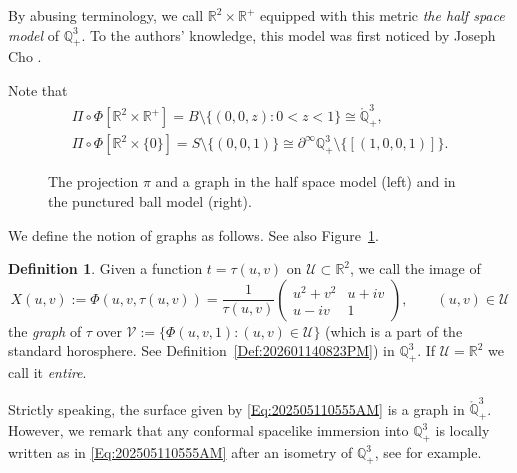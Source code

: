 \documentclass[12pt,reqno]{amsart}
\theoremstyle{plain} %
\theoremstyle{definition}
\newtheorem{definition}[theorem]{Definition}
\numberwithin{equation}{section}
\newcommand{\qthreep}{\mathbb{Q}^3_+}
\newcommand{\qthreept}{\mathring{\mathbb{Q}}^3_+}
\begin{document}
By abusing terminology, we call $\mathbb{R}^2 \times \mathbb{R}^+$ equipped with this metric \textit{the half space model} of $\qthreep$. To the authors' knowledge, this model was first noticed by Joseph Cho \cite{Cho}.

Note that
\begin{gather*}
	\Pi \circ \Phi[\mathbb{R}^2\times\mathbb{R}^+] = B\setminus\{(0,0,z):  0 < z < 1 \} \cong \qthreept, \\
	\Pi \circ \Phi[\mathbb{R}^2\times\{0\}] =S\setminus\{(0,0,1)\} \cong \partial^\infty\qthreep\setminus\{[(1,0,0,1)]\}.
\end{gather*}

\begin{figure}[t]
\begin{center}
\caption{The projection $\pi$ and a graph in the half space  model (left) and in the punctured ball model (right).}
\label{Fig:202603161139}
\end{center}
\end{figure}


We define the notion of graphs as follows. See also Figure~\ref{Fig:202603161139}.
\begin{definition}
	Given a function $t = \tau(u,v)$ on $\mathcal{U} \subset \mathbb{R}^2$, we call the image of
	\begin{equation}\label{Eq:202505110555AM}
		X(u,v) := \Phi(u,v, \tau(u,v))
		= \frac{1}{\tau(u,v)}\begin{pmatrix} u^2+v^2 & u+iv \\ u-iv & 1 \end{pmatrix},
		\qquad (u,v) \in \mathcal{U}
	\end{equation}
	the \textit{graph} of $\tau$ over $\mathcal{V} := \{ \Phi(u,v,1): (u,v) \in \mathcal{U}\}$ (which is a part of the standard horosphere. See Definition~\ref{Def:202601140823PM}) in $\qthreep$. If $\mathcal{U}= \mathbb{R}^2$ we call it \textit{entire}.
\end{definition}

Strictly speaking, the surface given by \eqref{Eq:202505110555AM} is a graph in $\qthreept$. However, we remark that any conformal spacelike immersion into $\qthreep$ is locally written as in \eqref{Eq:202505110555AM} after an isometry of $\qthreep$, see \cite{Liu2} for example.
\end{document}
